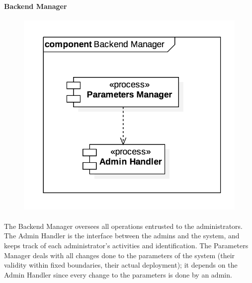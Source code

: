 		
		
		\paragraph{Backend Manager}
			\begin{figure}[h]
				\includegraphics[scale=0.4, center]{img/component_diagrams/11_backend_manager.png}
			\end{figure}
			
		\paragraph{} The Backend Manager oversees all operations entrusted to the administrators. The Admin Handler is the interface between the admins and the system, and keeps track of each administrator's activities and identification. The Parameters Manager deals with all changes done to the parameters of the system (their validity within fixed boundaries, their actual deployment); it depends on the Admin Handler since every change to the parameters is done by an admin. %
\FloatBarrier
	
		
		
		
